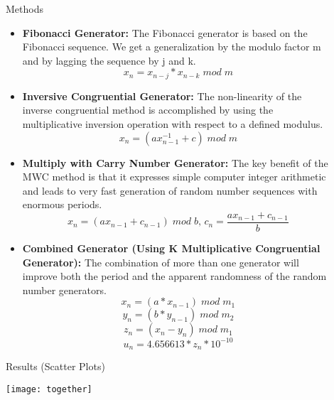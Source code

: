 \documentclass[final]{beamer}
\newlength{\sepwidth}
\newlength{\colwidth}
\newcommand{\separatorcolumn}{\begin{column}{\sepwidth}\end{column}}
\begin{document}
\begin{frame}[t]
\begin{columns}[t]
\begin{column}{\colwidth}
\begin{alertblock}{Methods}
\begin{itemize}
  \item  \textbf{Fibonacci Generator:}  The Fibonacci generator is based on the Fibonacci sequence. We get a generalization by the modulo factor m and by lagging the sequence by j and k.
     \[x_n=x_{n-j}*x_{n-k}\; mod \; m\]
  \item  \textbf{Inversive Congruential Generator:} The non-linearity of the inverse congruential method is accomplished by using the multiplicative inversion operation with respect to a defined modulus. 
  \[x_{{n}} = (ax_{n-1}^{{-1}}+c)\;mod \;m\]
  \item  \textbf{Multiply with Carry Number Generator:} The key benefit of the MWC method is that it expresses simple computer integer arithmetic and leads to very fast generation of random number sequences with enormous periods.
  \[x_n = (ax_{n-1}+c_{n-1})\;mod\;b,\, c_n =\frac{ax_{n-1} + c_{n-1}}{b}\]
  \item \textbf{Combined Generator (Using K Multiplicative Congruential Generator): }  
The combination of more than one generator will improve both the period and the apparent randomness of the random number generators.
\[x_{n} = (a*x_{n-1})\;mod\;m_1\]
\[y_{n} = (b*y_{n-1})\;mod\;m_2\]
\[z_{n} = (x_n-y_n)\;mod\;m_1\]
\[u_{n} = 4.656613*z_{n}*10^{-10}\]
  
\end{itemize}

  \end{alertblock}

  \begin{block}{Results (Scatter Plots)}
    \begin{center}
   \vspace{-1cm}
    \texttt{[image: together]}
   \end{center} 


  \end{block}

\end{column}

\separatorcolumn

\begin{column}{\colwidth}
   

\end{column}
\end{columns}
\end{frame}
\end{document}
